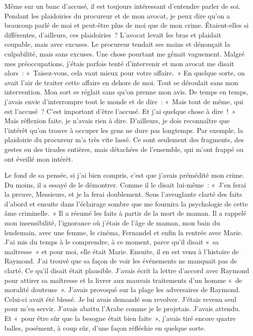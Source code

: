 \documentclass[french,twoside]{book} %
\newcommand\chaptercont{} %
\begin{document}
\chaptercont
\noindent Même sur un banc d’accusé, il est toujours intéressant d’entendre parler de soi. Pendant les plaidoiries du procureur et de mon avocat, je peux dire qu’on a beaucoup parlé de moi et peut-être plus de moi que de mon crime. Étaient-elles si différentes, d’ailleurs, ces plaidoiries ? L'avocat levait les bras et plaidait coupable, mais avec excuses. Le procureur tendait ses mains et dénonçait la culpabilité, mais sans excuses. Une chose pourtant me gênait vaguement. Malgré mes préoccupations, j’étais parfois tenté d’intervenir et mon avocat me disait alors : « Taisez-vous, cela vaut mieux pour votre affaire. » En quelque sorte, on avait l’air de traiter cette affaire en dehors de moi. Tout se déroulait sans mon intervention. Mon sort se réglait sans qu’on prenne mon avis. De temps en temps, j’avais envie d’interrompre tout le monde et de dire : « Mais tout de même, qui est l’accusé ? C'est important d’être l’accusé. Et j’ai quelque chose à dire ! » Mais réflexion faite, je n’avais rien à dire. D'ailleurs, je dois reconnaître que l’intérêt qu’on trouve à occuper les gens ne dure pas longtemps. Par exemple, la plaidoirie du procureur m’a très vite lassé. Ce sont seulement des fragments, des gestes ou des tirades entières, mais détachées de l’ensemble, qui m’ont frappé ou ont éveillé mon intérêt.\par
Le fond de sa pensée, si j’ai bien compris, c’est que j’avais prémédité mon crime. Du moins, il a essayé de le démontrer. Comme il le disait lui-même : « J'en ferai la preuve, Messieurs, et je la ferai doublement. Sous l’aveuglante clarté des faits d’abord et ensuite dans l’éclairage sombre que me fournira la psychologie de cette âme criminelle. » Il a résumé les faits à partir de la mort de maman. Il a rappelé mon insensibilité, l’ignorance où j’étais de l’âge de maman, mon bain du lendemain, avec une femme, le cinéma, Fernandel et enfin la rentrée avec Marie. J'ai mis du temps à le comprendre, à ce moment, parce qu’il disait « sa maîtresse » et pour moi, elle était Marie. Ensuite, il en est venu à l’histoire de Raymond. J'ai trouvé que sa façon de voir les événements ne manquait pas de clarté. Ce qu’il disait était plausible. J'avais écrit la lettre d’accord avec Raymond pour attirer sa maîtresse et la livrer aux mauvais traitements d’un homme « de moralité douteuse ». J'avais provoqué sur la plage les adversaires de Raymond. Celui-ci avait été blessé. Je lui avais demandé son revolver. J'étais revenu seul pour m’en servir. J'avais abattu l’Arabe comme je le projetais. J'avais attendu. Et « pour être sûr que la besogne était bien faite », j’avais tiré encore quatre balles, posément, à coup sûr, d’une façon réfléchie en quelque sorte.\par
\end{document}

